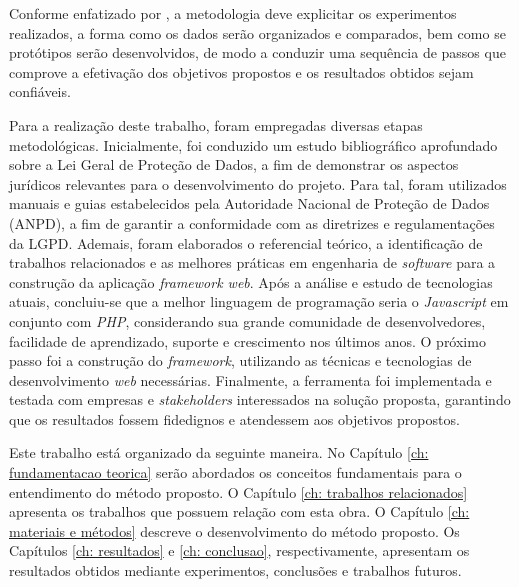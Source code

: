\documentclass[
	12pt,				%
	openright,			%
	oneside,			%
	a4paper,			%
	english,			%
	french,				%
	spanish,			%
	brazil,				%
	]{abntex2}
\begin{document}
Conforme enfatizado por , a metodologia deve explicitar os experimentos realizados, a forma como os dados serão organizados e comparados, bem como se protótipos serão desenvolvidos, de modo a conduzir uma sequência de passos que comprove a efetivação dos objetivos propostos e os resultados obtidos sejam confiáveis.


Para a realização deste trabalho, foram empregadas diversas etapas metodológicas. Inicialmente, foi conduzido um estudo bibliográfico aprofundado sobre a Lei Geral de Proteção de Dados, a fim de demonstrar os aspectos jurídicos relevantes para o desenvolvimento do projeto.
Para tal, foram utilizados manuais e guias estabelecidos pela Autoridade Nacional de Proteção de Dados (ANPD), a fim de garantir a conformidade com as diretrizes e regulamentações da LGPD. Ademais, foram elaborados o referencial teórico, a identificação de trabalhos relacionados e as melhores práticas em engenharia de \textit{software} para a construção da aplicação \textit{framework web}.
Após a análise e estudo de tecnologias atuais, concluiu-se que a melhor linguagem de programação seria o \textit{Javascript} em conjunto com \textit{PHP}, considerando sua grande comunidade de desenvolvedores, facilidade de aprendizado, suporte e crescimento nos últimos anos.  
O próximo passo foi a construção do \textit{framework}, utilizando as técnicas e tecnologias de desenvolvimento \textit{web} necessárias. Finalmente, a ferramenta foi implementada e testada com empresas e \textit{stakeholders} interessados na solução proposta, garantindo que os resultados fossem fidedignos e atendessem aos objetivos propostos.
 




Este trabalho está organizado da seguinte maneira. No Capítulo \ref{ch: fundamentacao teorica} serão abordados os conceitos fundamentais para o entendimento do método proposto. O Capítulo \ref{ch: trabalhos relacionados} apresenta os trabalhos que possuem relação com esta obra. O Capítulo \ref{ch: materiais e métodos} descreve o desenvolvimento do método proposto. Os Capítulos \ref{ch: resultados} e \ref{ch: conclusao}, respectivamente, apresentam os resultados obtidos mediante experimentos, conclusões e trabalhos futuros.


\setcounter{chapter}{1}
\end{document}
